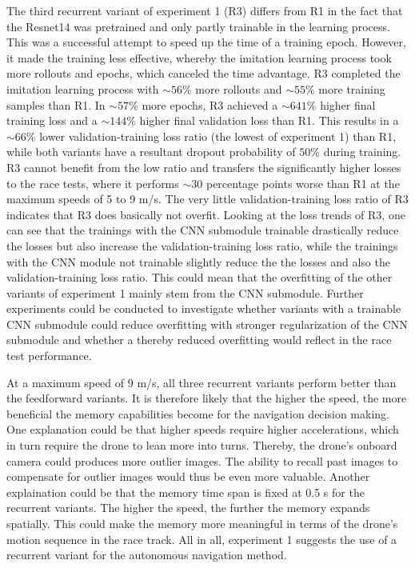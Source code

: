 The third recurrent variant of experiment 1 (R3)
differs from R1 in the fact that 
the Resnet14 was pretrained 
and only partly trainable in the learning process.
This was a successful attempt to speed up the time of a training epoch.
However, it made the training less effective,
whereby the imitation learning process took more rollouts and epochs,
which canceled the time advantage.
R3 completed the imitation learning process with $\sim 56 \%$ more rollouts
and $\sim 55 \%$ more training samples than R1.
In $\sim 57 \%$ more epochs,
R3 achieved a $\sim 641 \%$ higher final training loss
and a $\sim 144 \%$ higher final validation loss than R1.
This results in a $\sim 66 \%$ lower validation-training loss ratio (the lowest of experiment 1) 
than R1, 
while both variants have a resultant dropout probability of $50 \%$ during training.
R3 cannot benefit from the low ratio and transfers the significantly higher losses to the race tests,
where it performs $\sim 30$ percentage points worse than R1 at the maximum speeds of 5 to 9 m/s.
The very little validation-training loss ratio of R3 
indicates that R3 does basically not overfit.
Looking at the loss trends of R3,
one can see that the trainings with the CNN submodule trainable
drastically reduce the losses but also increase the validation-training loss ratio,
while the trainings with the CNN module not trainable
slightly reduce the the losses and also the validation-training loss ratio.
This could mean that the overfitting of the other variants of experiment 1
mainly stem from the CNN submodule.
Further experiments could be conducted 
to investigate whether variants
with a trainable CNN submodule
could reduce overfitting 
with stronger regularization of the CNN submodule 
and whether a thereby reduced overfitting would reflect in the race test performance.

At a maximum speed of 9 m/s, all three recurrent variants perform better than the feedforward variants.
It is therefore likely that the higher the speed, the more beneficial the memory capabilities become for
the navigation decision making.
One explanation could be that higher speeds require higher accelerations,
which in turn require the drone to lean more into turns.
Thereby, the drone's onboard camera could produces more outlier images.
The ability to recall past images to compensate for outlier images would thus be even more valuable.
Another explaination could be that the memory time span is fixed at 0.5 s for the recurrent variants.
The higher the speed, the further the memory expands spatially.
This could make the memory more meaningful in terms of the drone's motion sequence in the race track.
All in all, experiment 1 suggests the use of a recurrent variant for the autonomous navigation method.


